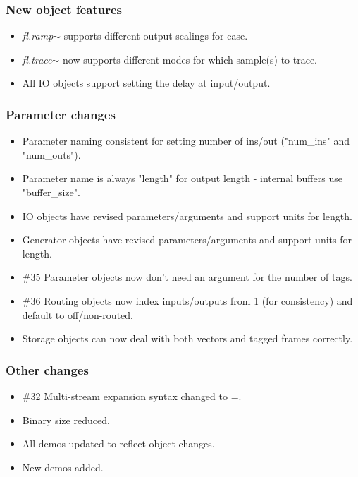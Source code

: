 \documentclass{article}
\newcommand{\flobject}[1]{\textit{fl.#1$\sim$}}
\begin{document}
\subsubsection{New object features}

\begin{itemize}
\item \flobject{ramp} supports different output scalings for ease.
\item \flobject{trace} now supports different modes for which sample(s) to trace.
\item All IO objects support setting the delay at input/output.
\end{itemize}

\subsubsection{Parameter changes}

\begin{itemize}
\item Parameter naming consistent for setting number of ins/out ("num\_ins" and "num\_outs").
\item Parameter name is always "length" for output length - internal buffers use "buffer\_size".
\item IO objects have revised parameters/arguments and support units for length.
\item Generator objects have revised parameters/arguments and support units for length.
\item {\#35} Parameter objects now don't need an argument for the number of tags.
\item {\#36} Routing objects now index inputs/outputs from 1 (for consistency) and default to off/non-routed.
\item Storage objects can now deal with both vectors and tagged frames correctly.
\end{itemize}

\subsubsection{Other changes}

\begin{itemize}
\item {\#32} Multi-stream expansion syntax changed to =.
\item Binary size reduced.
\item All demos updated to reflect object changes.
\item New demos added.
\end{itemize}
\end{document}
